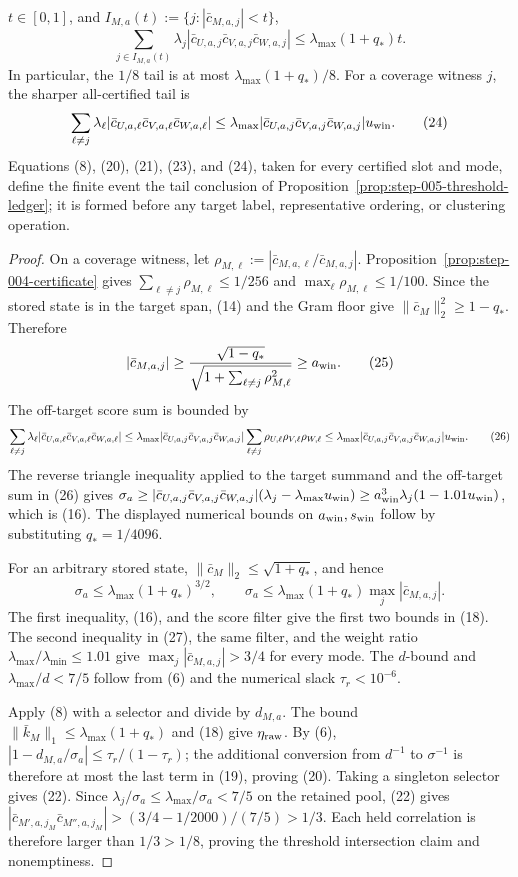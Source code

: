 \begin{proposition}
$t\in[0,1]$, and $I_{M,a}(t):=\{j:|\bar c_{M,a,j}|<t\}$,
\[
\sum_{j\in I_{M,a}(t)}\lambda_j
|\bar c_{U,a,j}\bar c_{V,a,j}\bar c_{W,a,j}|
\le\lambda_{\max}(1+q_*)t.
\tag{23}
\]
In particular, the $1/8$ tail is at most
$\lambda_{\max}(1+q_*)/8$.  For a coverage witness $j$, the sharper
all-certified tail is
\[
\sum_{\ell\ne j}\lambda_\ell
|\bar c_{U,a,\ell}\bar c_{V,a,\ell}\bar c_{W,a,\ell}|
\le\lambda_{\max}|\bar c_{U,a,j}\bar c_{V,a,j}\bar c_{W,a,j}|u_{\rm win}.
\tag{24}
\]
Equations (8), (20), (21), (23), and (24), taken for every certified slot
and mode, define the finite event the tail conclusion of Proposition~\ref{prop:step-005-threshold-ledger}; it is formed before any
target label, representative ordering, or clustering operation.

\begin{proof}
On a coverage witness, let
$\rho_{M,\ell}:=|\bar c_{M,a,\ell}/\bar c_{M,a,j}|$.
Proposition~\ref{prop:step-004-certificate} gives
$\sum_{\ell\ne j}\rho_{M,\ell}\le1/256$ and
$\max_\ell\rho_{M,\ell}\le1/100$.  Since the stored state is in the
target span, (14) and the Gram floor give
$\|\bar c_M\|_2^2\ge1-q_*$.  Therefore
\[
|\bar c_{M,a,j}|
\ge\frac{\sqrt{1-q_*}}
{\sqrt{1+\sum_{\ell\ne j}\rho_{M,\ell}^2}}
\ge a_{\rm win}.
\tag{25}
\]
The off-target score sum is bounded by
\[
\sum_{\ell\ne j}\lambda_\ell
|\bar c_{U,a,\ell}\bar c_{V,a,\ell}\bar c_{W,a,\ell}|
\le\lambda_{\max}|\bar c_{U,a,j}\bar c_{V,a,j}\bar c_{W,a,j}|
\sum_{\ell\ne j}\rho_{U,\ell}\rho_{V,\ell}\rho_{W,\ell}
\le\lambda_{\max}|\bar c_{U,a,j}\bar c_{V,a,j}\bar c_{W,a,j}|u_{\rm win}.
\tag{26}
\]
The reverse triangle inequality applied to the target summand and the
off-target sum in (26) gives
$\sigma_a\ge |\bar c_{U,a,j}\bar c_{V,a,j}\bar c_{W,a,j}|
(\lambda_j-\lambda_{\max}u_{\rm win})
\ge a_{\rm win}^3\lambda_j(1-1.01u_{\rm win})$,
which is (16). The displayed numerical bounds on $a_{\rm win},s_{\rm win}$
follow by substituting $q_*=1/4096$.

For an arbitrary stored state, $\|\bar c_M\|_2\le\sqrt{1+q_*}$, and hence
\[
\sigma_a\le\lambda_{\max}(1+q_*)^{3/2},\qquad
\sigma_a\le\lambda_{\max}(1+q_*)\max_j|\bar c_{M,a,j}|.
\tag{27}
\]
The first inequality, (16), and the score filter give the first two bounds in
(18).  The second inequality in (27), the same filter, and
the weight ratio $\lambda_{\max}/\lambda_{\min}\le1.01$ give
$\max_j|\bar c_{M,a,j}|>3/4$ for every mode. The $d$-bound and
$\lambda_{\max}/d<7/5$ follow from (6) and the numerical slack
$\tau_r<10^{-6}$.

Apply (8) with a selector and divide by $d_{M,a}$. The bound
$\|\bar k_M\|_1\le\lambda_{\max}(1+q_*)$ and (18) give
$\eta_{\rm raw}$. By (6),
$|1-d_{M,a}/\sigma_a|\le\tau_r/(1-\tau_r)$; the additional conversion
from $d^{-1}$ to $\sigma^{-1}$ is therefore at most the last term in (19),
proving (20). Taking a singleton selector gives (22). Since
$\lambda_j/\sigma_a\le\lambda_{\max}/\sigma_a<7/5$ on the retained pool,
(22) gives
$|\bar c_{M',a,j_M}\bar c_{M'',a,j_M}|>(3/4-1/2000)/(7/5)>1/3$.
Each held correlation is therefore larger than $1/3>1/8$, proving the
threshold intersection claim and nonemptiness.


\end{proof}
\end{proposition}
